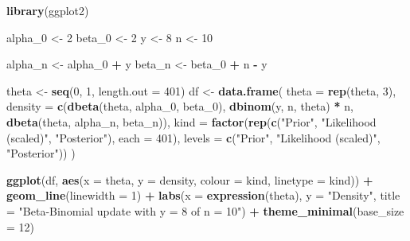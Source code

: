 \documentclass[
]{article}
\newenvironment{Shaded}{\begin{snugshade}}{\end{snugshade}}
\newcommand{\AttributeTok}[1]{\textcolor[rgb]{0.13,0.29,0.53}{#1}}
\newcommand{\DecValTok}[1]{\textcolor[rgb]{0.00,0.00,0.81}{#1}}
\newcommand{\FunctionTok}[1]{\textcolor[rgb]{0.13,0.29,0.53}{\textbf{#1}}}
\newcommand{\NormalTok}[1]{#1}
\newcommand{\OtherTok}[1]{\textcolor[rgb]{0.56,0.35,0.01}{#1}}
\newcommand{\SpecialCharTok}[1]{\textcolor[rgb]{0.81,0.36,0.00}{\textbf{#1}}}
\newcommand{\StringTok}[1]{\textcolor[rgb]{0.31,0.60,0.02}{#1}}
\begin{document}
\begin{Shaded}
\begin{Highlighting}[]
\FunctionTok{library}\NormalTok{(ggplot2)}

\NormalTok{alpha\_0 }\OtherTok{\textless{}{-}} \DecValTok{2}
\NormalTok{beta\_0  }\OtherTok{\textless{}{-}} \DecValTok{2}
\NormalTok{y       }\OtherTok{\textless{}{-}} \DecValTok{8}
\NormalTok{n       }\OtherTok{\textless{}{-}} \DecValTok{10}

\NormalTok{alpha\_n }\OtherTok{\textless{}{-}}\NormalTok{ alpha\_0 }\SpecialCharTok{+}\NormalTok{ y}
\NormalTok{beta\_n  }\OtherTok{\textless{}{-}}\NormalTok{ beta\_0 }\SpecialCharTok{+}\NormalTok{ n }\SpecialCharTok{{-}}\NormalTok{ y}

\NormalTok{theta }\OtherTok{\textless{}{-}} \FunctionTok{seq}\NormalTok{(}\DecValTok{0}\NormalTok{, }\DecValTok{1}\NormalTok{, }\AttributeTok{length.out =} \DecValTok{401}\NormalTok{)}
\NormalTok{df }\OtherTok{\textless{}{-}} \FunctionTok{data.frame}\NormalTok{(}
  \AttributeTok{theta =} \FunctionTok{rep}\NormalTok{(theta, }\DecValTok{3}\NormalTok{),}
  \AttributeTok{density =} \FunctionTok{c}\NormalTok{(}\FunctionTok{dbeta}\NormalTok{(theta, alpha\_0, beta\_0),}
              \FunctionTok{dbinom}\NormalTok{(y, n, theta) }\SpecialCharTok{*}\NormalTok{ n,}
              \FunctionTok{dbeta}\NormalTok{(theta, alpha\_n, beta\_n)),}
  \AttributeTok{kind =} \FunctionTok{factor}\NormalTok{(}\FunctionTok{rep}\NormalTok{(}\FunctionTok{c}\NormalTok{(}\StringTok{"Prior"}\NormalTok{, }\StringTok{"Likelihood (scaled)"}\NormalTok{, }\StringTok{"Posterior"}\NormalTok{),}
                    \AttributeTok{each =} \DecValTok{401}\NormalTok{),}
                \AttributeTok{levels =} \FunctionTok{c}\NormalTok{(}\StringTok{"Prior"}\NormalTok{, }\StringTok{"Likelihood (scaled)"}\NormalTok{, }\StringTok{"Posterior"}\NormalTok{))}
\NormalTok{)}

\FunctionTok{ggplot}\NormalTok{(df, }\FunctionTok{aes}\NormalTok{(}\AttributeTok{x =}\NormalTok{ theta, }\AttributeTok{y =}\NormalTok{ density, }\AttributeTok{colour =}\NormalTok{ kind, }\AttributeTok{linetype =}\NormalTok{ kind)) }\SpecialCharTok{+}
  \FunctionTok{geom\_line}\NormalTok{(}\AttributeTok{linewidth =} \DecValTok{1}\NormalTok{) }\SpecialCharTok{+}
  \FunctionTok{labs}\NormalTok{(}\AttributeTok{x =} \FunctionTok{expression}\NormalTok{(theta), }\AttributeTok{y =} \StringTok{"Density"}\NormalTok{,}
       \AttributeTok{title =} \StringTok{"Beta{-}Binomial update with y = 8 of n = 10"}\NormalTok{) }\SpecialCharTok{+}
  \FunctionTok{theme\_minimal}\NormalTok{(}\AttributeTok{base\_size =} \DecValTok{12}\NormalTok{)}
\end{Highlighting}
\end{Shaded}
\end{document}
